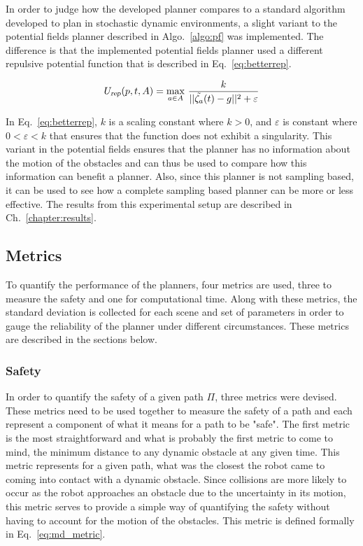 \documentclass[letterpaper, 10pt, conference]{ieeeconf}
\newcommand{\Var}[1]{\ensuremath{{{\textsl{#1}}}}}
\begin{document}
In order to judge how the developed planner compares to a standard algorithm
developed to plan in stochastic dynamic environments, a slight variant to the
potential fields planner described in Algo.~\ref{algo:pf} was implemented. The
difference is that the implemented potential fields planner used a different
repulsive potential function that is described in Eq.~\ref{eq:betterrep}.

\begin{equation}
    U_{\Var{rep}}(p, t, A) = \max_{a \in A} \,
    \frac{k}{||\tilde{\zeta_a}(t) - g||^2 + \varepsilon}
    \label{eq:betterrep}
\end{equation}

In Eq.~\ref{eq:betterrep}, $k$ is a scaling constant where $k > 0$, and
$\varepsilon$ is constant where $0 < \varepsilon < k$ that ensures that the
function does not exhibit a singularity. This variant in the potential fields
ensures that the planner has no information about the motion of the obstacles
and can thus be used to compare how this information can benefit a planner.
Also, since this planner is not sampling based, it can be used to see how a
complete sampling based planner can be more or less effective. The results from
this experimental setup are described in Ch.~\ref{chapter:results}.

\subsection{Metrics}

To quantify the performance of the planners, four metrics are used, three to
measure the safety and one for computational time. Along with these metrics,
the standard deviation is collected for each scene and set of parameters in
order to gauge the reliability of the planner under different circumstances.
These metrics are described in the sections below.

\subsubsection{Safety}

In order to quantify the safety of a given path $\Pi$, three metrics were
devised. These metrics need to be used together to measure the safety of a path
and each represent a component of what it means for a path to be "safe". The
first metric is the most straightforward and what is probably the first metric
to come to mind, the minimum distance to any dynamic obstacle at any given
time. This metric represents for a given path, what was the closest the robot
came to coming into contact with a dynamic obstacle. Since collisions are more
likely to occur as the robot approaches an obstacle due to the uncertainty in
its motion, this metric serves to provide a simple way of quantifying the
safety without having to account for the motion of the obstacles. This metric
is defined formally in Eq.~\ref{eq:md_metric}.
\end{document}
